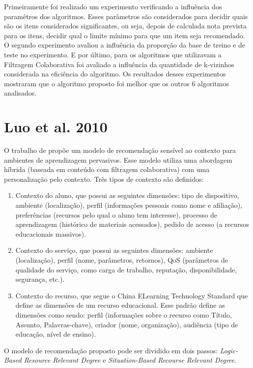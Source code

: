 Primeiramente foi realizado um experimento verificando a influência dos paramêtros dos algoritmos. Esses parâmetros são
considerados para decidir quais são os itens considerados significantes, ou seja, depois de calculada nota prevista para os itens, decidir qual o limite mínimo
para que um item seja recomendado. O segundo experimento avaliou a influência da proporção da base de treino e de teste
no experimento. E por último, para os algoritmos que utilizavam a Filtragem Colaborativa foi
avaliado a influência da quantidade de k-vizinhos considerada na eficiência do algoritmo. Os resultados desses experimentos
mostraram que o algoritmo proposto foi melhor que os outros 6 algoritmos analisados.

\section{Luo et al. 2010}

O trabalho de  propõe um modelo de recomendação sensível ao contexto para ambientes de
aprendizagem pervasivos. Esse modelo utiliza uma abordagem híbrida (baseada em conteúdo com filtragem colaborativa)
com uma personalização pelo contexto. Três tipos de contexto são definidos:

\begin{enumerate}
\item Contexto do aluno, que possui as seguintes dimensões: tipo de dispositivo, ambiente (localização), perfil
(informações pessoais como nome e afiliação), preferências (recursos pelo qual o aluno tem interesse), processo de
aprendizagem (histórico de materiais acessados), pedido de acesso (a recursos educacionais massivos).
\item Contexto do serviço, que possui as seguintes dimensões: ambiente (localização), perfil (nome, parâmetros,
retornos), QoS (parâmetros de qualidade do serviço, como carga de trabalho, reputação, disponibilidade, segurança, etc.).
\item Contexto do recurso, que segue o China ELearning Technology Standard que define as dimensões de um recurso
educacional. Esse padrão define as dimensões como sendo: perfil (informações sobre o recurso como Título, Assunto,
Palavras-chave), criador (nome, organização), audiência (tipo de educação, nível de ensino).
\end{enumerate}

O modelo de recomendação proposto pode ser dividido em dois passos: \textit{Logic-Based Resource Relevant Degree} e
\textit{Situation-Based Recourse Relevant Degree}.

